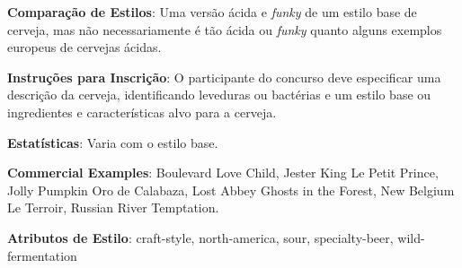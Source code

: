 \textbf{Comparação de Estilos}: Uma versão ácida e \textit{funky} de um estilo base de cerveja, mas não necessariamente é tão ácida ou \textit{funky} quanto alguns exemplos europeus de cervejas ácidas.

\textbf{Instruções para Inscrição}: O participante do concurso deve especificar uma descrição da cerveja, identificando leveduras ou bactérias e um estilo base ou ingredientes e características alvo para a cerveja.

\textbf{Estatísticas}: Varia com o estilo base.

\textbf{Commercial Examples}: Boulevard Love Child, Jester King Le Petit Prince, Jolly Pumpkin Oro de Calabaza, Lost Abbey Ghosts in the Forest, New Belgium Le Terroir, Russian River Temptation.

\textbf{Atributos de Estilo}: craft-style, north-america, sour, specialty-beer, wild-fermentation
